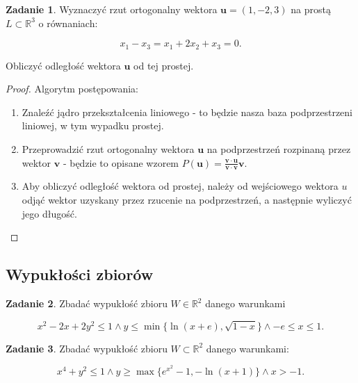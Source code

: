 \documentclass[11pt]{article}
\theoremstyle{definition}
\newtheorem{zadanie}{Zadanie}
\begin{document}
\begin{zadanie}
    Wyznaczyć rzut ortogonalny wektora $\mathbf u=(1,-2,3)$ na prostą $L\subset \mathbb R^3$ o równaniach:

    $$x_1-x_3 = x_1+2x_2+x_3 = 0.$$

    Obliczyć odległość wektora $\mathbf u$ od tej prostej.
\end{zadanie}
\begin{proof}
    Algorytm postępowania:
    \begin{enumerate}
        \item Znaleźć jądro przekształcenia liniowego - to będzie nasza baza podprzestrzeni liniowej, w tym wypadku prostej.
        \item Przeprowadzić rzut ortogonalny wektora $\mathbf u$ na podprzestrzeń rozpinaną przez wektor $\mathbf v$ - będzie to opisane wzorem $P(\mathbf u) = \frac{\mathbf v\cdot \mathbf u}{\mathbf v\cdot \mathbf v}\mathbf v$.
        \item Aby obliczyć odległość wektora od prostej, należy od wejściowego wektora $u$ odjąć wektor uzyskany przez rzucenie na podprzestrzeń, a następnie wyliczyć jego długość.
    \end{enumerate}
\end{proof}

\subsection{Wypukłości zbiorów}

\begin{zadanie}
Zbadać wypukłość zbioru $W\in\mathbb R^2$ danego warunkami

$$x^2-2x+2y^2\leq 1\wedge y\leq\min\{\ln(x+e),\sqrt{1-x}\}\wedge -e\leq x\leq 1.$$
\end{zadanie}

\begin{zadanie}
    Zbadać wypukłość zbioru $W\subset \mathbb R^2$ danego warunkami:

    $$x^4+y^2\leq 1 \wedge y\geq \max\{e^{x^2}-1, -\ln(x+1)\}\wedge x>-1.$$
\end{zadanie}


\end{document}
